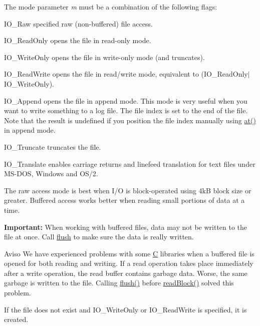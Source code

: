 The mode parameter {\itshape m} must be a combination of the following flags\-: 
\begin{DoxyItemize}
\item {\ttfamily I\-O\-\_\-\-Raw} specified raw (non-\/buffered) file access. 
\item {\ttfamily I\-O\-\_\-\-Read\-Only} opens the file in read-\/only mode. 
\item {\ttfamily I\-O\-\_\-\-Write\-Only} opens the file in write-\/only mode (and truncates). 
\item {\ttfamily I\-O\-\_\-\-Read\-Write} opens the file in read/write mode, equivalent to {\ttfamily }(I\-O\-\_\-\-Read\-Only$|$\-I\-O\-\_\-\-Write\-Only). 
\item {\ttfamily I\-O\-\_\-\-Append} opens the file in append mode. This mode is very useful when you want to write something to a log file. The file index is set to the end of the file. Note that the result is undefined if you position the file index manually using \hyperlink{class_q_file_a3bce8d0bb4d6fbaa012b9a61c3910907}{at()} in append mode. 
\item {\ttfamily I\-O\-\_\-\-Truncate} truncates the file. 
\item {\ttfamily I\-O\-\_\-\-Translate} enables carriage returns and linefeed translation for text files under M\-S-\/\-D\-O\-S, Windows and O\-S/2. 
\end{DoxyItemize}

The raw access mode is best when I/\-O is block-\/operated using 4k\-B block size or greater. Buffered access works better when reading small portions of data at a time.

{\bfseries Important\-:} When working with buffered files, data may not be written to the file at once. Call \hyperlink{class_q_file_adac116554b543b7c4228c018a85882f5}{flush} to make sure the data is really written.

\begin{DoxyWarning}{Aviso}
We have experienced problems with some \hyperlink{class_c}{C} libraries when a buffered file is opened for both reading and writing. If a read operation takes place immediately after a write operation, the read buffer contains garbage data. Worse, the same garbage is written to the file. Calling \hyperlink{class_q_file_adac116554b543b7c4228c018a85882f5}{flush()} before \hyperlink{class_q_file_a728f540fa66b4fe748da2b637e2d72e1}{read\-Block()} solved this problem.
\end{DoxyWarning}
If the file does not exist and {\ttfamily I\-O\-\_\-\-Write\-Only} or {\ttfamily I\-O\-\_\-\-Read\-Write} is specified, it is created.

